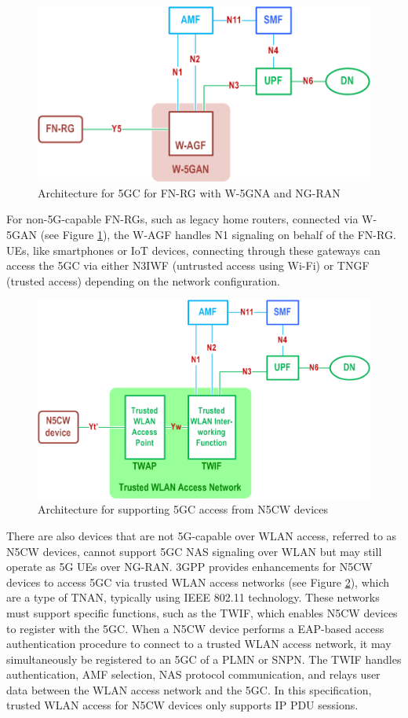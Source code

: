 \begin{figure}
    \centering
    \includegraphics[width=0.5\linewidth]{figs/Architecture for 5G Core Network for FN-RG with Wireline 5G Access network and NG RAN.png}
    \caption{Architecture for \acl{5GC} for \ac{FN-RG} with \ac{W-5GNA} and \ac{NG-RAN}}
    \label{fig:Architecture for 5G Core Network for FN-RG with Wireline 5G Access network and NG RAN}
\end{figure}

For non-\ac{5G}-capable \acp{FN-RG}, such as legacy home routers, connected via \ac{W-5GAN} (see Figure \ref{fig:Architecture for 5G Core Network for FN-RG with Wireline 5G Access network and NG RAN}), the \ac{W-AGF} handles N1 signaling on behalf of the \ac{FN-RG}. \acp{UE}, like smartphones or \ac{IoT} devices, connecting through these gateways can access the \ac{5GC} via either \ac{N3IWF} (untrusted access using Wi-Fi) or \ac{TNGF} (trusted access) depending on the network configuration.

\begin{figure}
    \centering
    \includegraphics[width=0.5\linewidth]{figs/Architecture for supporting 5GC access from N5CW devices.png}
    \caption{Architecture for supporting \ac{5GC} access from \ac{N5CW} devices}
    \label{fig:Architecture for supporting 5GC access from N5CW devices}
\end{figure}

There are also devices that are not \ac{5G}-capable over \ac{WLAN} access, referred to as \ac{N5CW} devices, cannot support \ac{5GC} \ac{NAS} signaling over \ac{WLAN} but may still operate as \ac{5G} \acp{UE} over \ac{NG-RAN}. \ac{3GPP} provides enhancements for N5CW devices to access \ac{5GC} via trusted \ac{WLAN} access networks (see Figure \ref{fig:Architecture for supporting 5GC access from N5CW devices}), which are a type of \ac{TNAN}, typically using IEEE 802.11 technology. These networks must support specific functions, such as the \ac{TWIF}, which enables \ac{N5CW} devices to register with the \ac{5GC}. When a \ac{N5CW} device performs a \ac{EAP}-based access authentication procedure to connect to a trusted \ac{WLAN} access network, it may simultaneously be registered to an \ac{5GC} of a \ac{PLMN} or \ac{SNPN}. The \ac{TWIF} handles authentication, \ac{AMF} selection, \ac{NAS} protocol communication, and relays user data between the \ac{WLAN} access network and the \ac{5GC}. In this specification, trusted \ac{WLAN} access for \ac{N5CW} devices only supports IP \ac{PDU} sessions.

